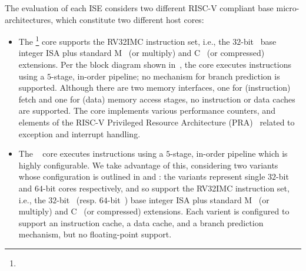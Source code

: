 
The evaluation of each ISE considers two different RISC-V compliant base
micro-architectures, which constitute two different host cores:

\begin{itemize}
\item The \footnote{%
      } core 
      supports the 
      RV32IMC 
      instruction set, i.e.,
      the 
             $32$-bit~\cite[Section 2]{RV:ISA:I:19} 
      base integer ISA plus 
      standard M~\cite[Section  7]{RV:ISA:I:19}
               (or   multiply)
               and
               C~\cite[Section 16]{RV:ISA:I:19}
               (or compressed)
               extensions.
      Per the block diagram shown in~,
      the core 
      executes instructions using a $5$-stage, in-order pipeline;
      no mechanism for
      branch prediction
      is supported.
      Although there are two memory interfaces, one for (instruction) fetch and one for (data) memory access stages,
      no
      instruction or data caches 
      are supported.
      The core implements various performance counters,
      and
      elements of the
      RISC-V Privileged Resource Architecture (PRA)~\cite[Chapter 3]{RV:ISA:II:17}
      related to exception and interrupt handling.

\item The ~\cite{rocket:16} 
        core
      executes instructions using a $5$-stage, in-order pipeline
      which is highly configurable.
      We take advantage of this, considering two variants whose configuration
      is outlined in
      and 
      :
      the variants represent single $32$-bit and $64$-bit cores respectively,
      and so
      support  the 
      RV32IMC 
      instruction set, i.e.,
      the 
             $32$-bit~\cite[Section 2]{RV:ISA:I:19} 
      (resp. $64$-bit~\cite[Section 5]{RV:ISA:I:19})
      base integer ISA plus 
      standard M~\cite[Section  7]{RV:ISA:I:19}
               (or   multiply)
               and
               C~\cite[Section 16]{RV:ISA:I:19}
               (or compressed)
               extensions.
      Each varient is configured to support
      an instruction cache, 
      a  data        cache,
      and
      a  branch prediction mechanism,
      but 
      no floating-point support.

\end{itemize}

